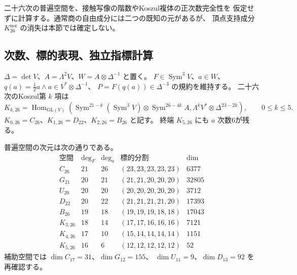 二十六次の普遍空間を、接触写像の階数やKoszul複体の正次数完全性を
仮定せずに計算する。通常商の自由成分には二つの既知の元があるが、
頂点支持成分 $K^{\mathrm{nor}}_{26}$ の消失は本節では確定しない。

\subsection{次数、標的表現、独立指標計算}

$\Delta=\det V$、$A=\Lambda^2V$、$W=A\otimes\Delta^{-1}$ と置く。
$F\in\operatorname{Sym}^3V$、$a\in W$、
$q(a)=\tfrac12a\wedge a\in V^*\otimes\Delta^{-1}$、
$P=F(q(a))\in\Delta^{-3}$ の規約を維持する。
二十六次のKoszul第 $k$ 項は
\[
 K_{k,26}=\operatorname{Hom}_{\mathrm{GL}(V)}
 \left(\operatorname{Sym}^{21-k}(\operatorname{Sym}^3V)
 \otimes\operatorname{Sym}^{26-4k}A,
 \Lambda^kV^*\otimes\Delta^{23-2k}\right),\qquad 0\leq k\leq5.
\]
$K_{0,26}=C_{26}$、$K_{1,26}=D_{22}$、$K_{2,26}=B_{26}$ と記す。
終端 $K_{5,26}$ にも $a$ 次数6が残る。

\begin{proposition}[二十六次の厳密次元]
\label{prop:v18-character-dimensions}
普遍空間の次元は次の通りである。
\[
\begin{array}{c|r|r|c|r}
\text{空間}&\deg_F&\deg_a&\text{標的分割}&\dim\\\hline
C_{26}&21&26&(23,23,23,23,23)&6377\\
G_{21}&20&21&(21,21,20,20,20)&32805\\
U_{20}&20&20&(20,20,20,20,20)&3712\\
D_{22}&20&22&(21,21,21,21,20)&17393\\
B_{26}&19&18&(19,19,19,18,18)&17043\\
K_{3,26}&18&14&(17,17,16,16,16)&7121\\
K_{4,26}&17&10&(15,14,14,14,14)&1151\\
K_{5,26}&16&6&(12,12,12,12,12)&52
\end{array}
\]
補助空間では $\dim C_{17}=31$、$\dim G_{12}=155$、
$\dim U_{11}=9$、$\dim D_{13}=92$ を再確認する。
\end{proposition}

